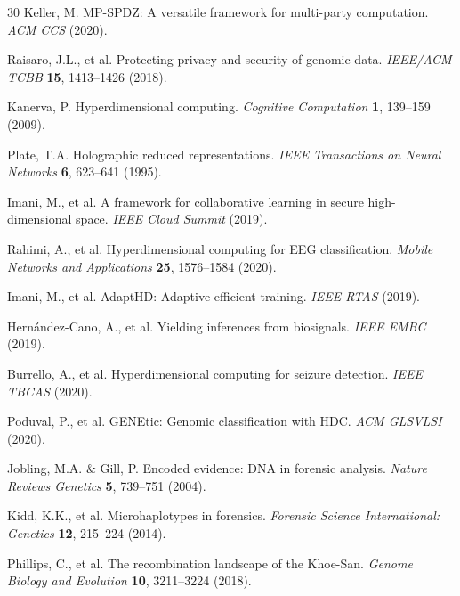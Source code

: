 \documentclass[11pt,a4paper]{article}
\begin{document}
\begin{thebibliography}{30}
Keller, M.
\newblock MP-SPDZ: A versatile framework for multi-party computation.
\newblock \emph{ACM CCS} (2020).

Raisaro, J.L., et al.
\newblock Protecting privacy and security of genomic data.
\newblock \emph{IEEE/ACM TCBB} \textbf{15}, 1413--1426 (2018).

Kanerva, P.
\newblock Hyperdimensional computing.
\newblock \emph{Cognitive Computation} \textbf{1}, 139--159 (2009).

Plate, T.A.
\newblock Holographic reduced representations.
\newblock \emph{IEEE Transactions on Neural Networks} \textbf{6}, 623--641 (1995).

Imani, M., et al.
\newblock A framework for collaborative learning in secure high-dimensional space.
\newblock \emph{IEEE Cloud Summit} (2019).

Rahimi, A., et al.
\newblock Hyperdimensional computing for EEG classification.
\newblock \emph{Mobile Networks and Applications} \textbf{25}, 1576--1584 (2020).

Imani, M., et al.
\newblock AdaptHD: Adaptive efficient training.
\newblock \emph{IEEE RTAS} (2019).

Hern\'{a}ndez-Cano, A., et al.
\newblock Yielding inferences from biosignals.
\newblock \emph{IEEE EMBC} (2019).

Burrello, A., et al.
\newblock Hyperdimensional computing for seizure detection.
\newblock \emph{IEEE TBCAS} (2020).

Poduval, P., et al.
\newblock GENEtic: Genomic classification with HDC.
\newblock \emph{ACM GLSVLSI} (2020).

Jobling, M.A. \& Gill, P.
\newblock Encoded evidence: DNA in forensic analysis.
\newblock \emph{Nature Reviews Genetics} \textbf{5}, 739--751 (2004).

Kidd, K.K., et al.
\newblock Microhaplotypes in forensics.
\newblock \emph{Forensic Science International: Genetics} \textbf{12}, 215--224 (2014).

Phillips, C., et al.
\newblock The recombination landscape of the Khoe-San.
\newblock \emph{Genome Biology and Evolution} \textbf{10}, 3211--3224 (2018).


\end{thebibliography}
\end{document}
